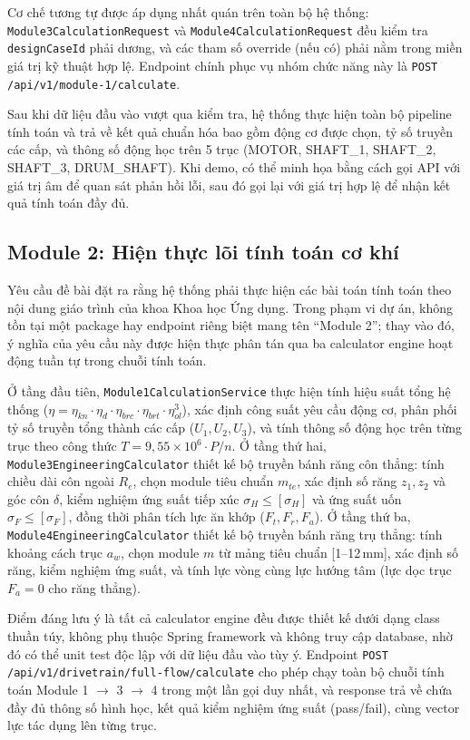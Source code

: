 \documentclass[a4paper]{article}
\begin{document}
Cơ chế tương tự được áp dụng nhất quán trên toàn bộ hệ thống: \texttt{Module3CalculationRequest} và \texttt{Module4CalculationRequest} đều kiểm tra \texttt{designCaseId} phải dương, và các tham số override (nếu có) phải nằm trong miền giá trị kỹ thuật hợp lệ. Endpoint chính phục vụ nhóm chức năng này là \texttt{POST /api/v1/module-1/calculate}.

Sau khi dữ liệu đầu vào vượt qua kiểm tra, hệ thống thực hiện toàn bộ pipeline tính toán và trả về kết quả chuẩn hóa bao gồm động cơ được chọn, tỷ số truyền các cấp, và thông số động học trên 5 trục (MOTOR, SHAFT\_1, SHAFT\_2, SHAFT\_3, DRUM\_SHAFT). Khi demo, có thể minh họa bằng cách gọi API với giá trị âm để quan sát phản hồi lỗi, sau đó gọi lại với giá trị hợp lệ để nhận kết quả tính toán đầy đủ.

\subsection{Module 2: Hiện thực lõi tính toán cơ khí}

Yêu cầu đề bài đặt ra rằng hệ thống phải thực hiện các bài toán tính toán theo nội dung giáo trình của khoa Khoa học Ứng dụng. Trong phạm vi dự án, không tồn tại một package hay endpoint riêng biệt mang tên ``Module 2''; thay vào đó, ý nghĩa của yêu cầu này được hiện thực phân tán qua ba calculator engine hoạt động tuần tự trong chuỗi tính toán.

Ở tầng đầu tiên, \texttt{Module1CalculationService} thực hiện tính hiệu suất tổng hệ thống ($\eta = \eta_{kn} \cdot \eta_d \cdot \eta_{brc} \cdot \eta_{brt} \cdot \eta_{ol}^3$), xác định công suất yêu cầu động cơ, phân phối tỷ số truyền tổng thành các cấp ($U_1, U_2, U_3$), và tính thông số động học trên từng trục theo công thức $T = 9{,}55 \times 10^6 \cdot P / n$. Ở tầng thứ hai, \texttt{Module3EngineeringCalculator} thiết kế bộ truyền bánh răng côn thẳng: tính chiều dài côn ngoài $R_e$, chọn module tiêu chuẩn $m_{te}$, xác định số răng $z_1, z_2$ và góc côn $\delta$, kiểm nghiệm ứng suất tiếp xúc $\sigma_H \le [\sigma_H]$ và ứng suất uốn $\sigma_F \le [\sigma_F]$, đồng thời phân tích lực ăn khớp ($F_t, F_r, F_a$). Ở tầng thứ ba, \texttt{Module4EngineeringCalculator} thiết kế bộ truyền bánh răng trụ thẳng: tính khoảng cách trục $a_w$, chọn module $m$ từ mảng tiêu chuẩn [1--12\,mm], xác định số răng, kiểm nghiệm ứng suất, và tính lực vòng cùng lực hướng tâm (lực dọc trục $F_a = 0$ cho răng thẳng).

Điểm đáng lưu ý là tất cả calculator engine đều được thiết kế dưới dạng class thuần túy, không phụ thuộc Spring framework và không truy cập database, nhờ đó có thể unit test độc lập với dữ liệu đầu vào tùy ý. Endpoint \texttt{POST /api/v1/drivetrain/full-flow/calculate} cho phép chạy toàn bộ chuỗi tính toán Module 1 $\rightarrow$ 3 $\rightarrow$ 4 trong một lần gọi duy nhất, và response trả về chứa đầy đủ thông số hình học, kết quả kiểm nghiệm ứng suất (pass/fail), cùng vector lực tác dụng lên từng trục.
\end{document}
